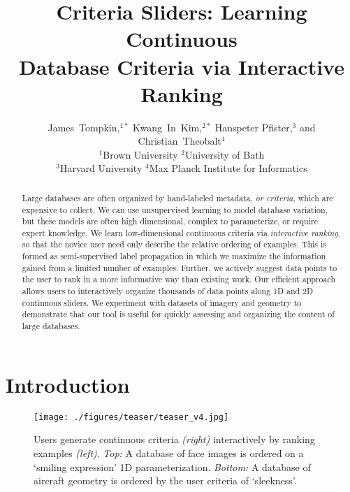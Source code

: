 \documentclass{article}
\begin{document}
\title{Criteria Sliders: Learning Continuous\\Database Criteria via Interactive Ranking}
\author{James~Tompkin,$^{1*}$ Kwang~In~Kim,$^{2*}$ Hanspeter Pfister,$^3$ and Christian~Theobalt$^4$\\
$^1$Brown University
$^2$University of Bath \\
$^3$Harvard University 
$^4$Max Planck Institute for Informatics 
}
\date{}

\maketitle

\begin{abstract}\noindent
Large databases are often organized by hand-labeled metadata, \textit{or criteria}, which are expensive to collect. We can use unsupervised learning to model database variation, but these models are often high dimensional, complex to parameterize, or require expert knowledge. We learn low-dimensional continuous criteria via \emph{interactive ranking}, so that the novice user need only describe the relative ordering of examples. This is formed as semi-supervised label propagation in which we maximize the information gained from a limited number of examples. Further, we actively suggest data points to the user to rank in a more informative way than existing work. Our efficient approach allows users to interactively organize thousands of data points along 1D and 2D continuous sliders. We experiment with datasets of imagery and geometry to demonstrate that our tool is useful for quickly assessing and organizing the content of large databases.
\end{abstract}



\section{Introduction}
\begin{figure}[t]
    \centering
		\texttt{[image: ./figures/teaser/teaser\_v4.jpg]}
    \caption{Users generate continuous criteria \emph{(right)} interactively by ranking examples \emph{(left)}. \emph{Top:} A database of face images is ordered on a `smiling expression' 1D parameterization. \emph{Bottom:} A database of aircraft geometry is ordered by the user criteria of `sleekness'.}
    \label{fig:teaser}
\end{figure}
\end{document}
